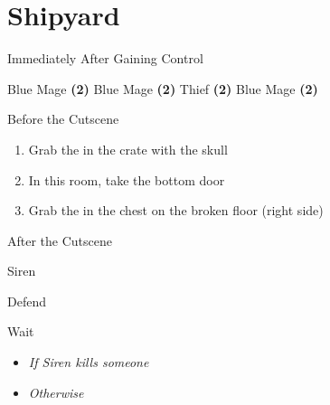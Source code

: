 \chapter{Shipyard}

\vspace{\baselineskip}

\begin{paracol}{2}

\begin{menu}{Immediately After Gaining Control}
	\varwb
    \begin{jobMenu}
        \lenna Blue Mage \textbf{(2\pointLeft)} \optimize
        \galuf Blue Mage \textbf{(2\pointLeft)} \equip{\broadsword}
        \faris Thief \textbf{(2\pointRight)}
        \bartz Blue Mage \textbf{(2\pointLeft)} \optimize
	\end{jobMenu}
    \varwe
\end{menu}

\switchcolumn
\begin{steproute}{Before the Cutscene}
\end{steproute}

\switchcolumn
\begin{enumerate}
    \item Grab the  in the crate with the skull
    \item In this room, take the bottom door
    \item Grab the  in the chest on the broken floor (right side)
\end{enumerate}

\switchcolumn
\begin{steproute}{After the Cutscene}
\end{steproute}

\switchcolumn
\begin{boss}{Siren}
    \varwb
    \begin{round}{1}
        \faris Defend
        \everyone \leftCommand{\blue} \then \goblinPunch
    \end{round}
    \begin{round}{2}
        \item {}
        \faris Wait
        \begin{itemize}
            \item \textit{If Siren kills someone} \then \battleGroup{\textbf{\phoenixDown}}
            \item \textit{Otherwise} \then {}
        \end{itemize}
        \everyone \leftCommand{\blue} \then \goblinPunch
    \end{round}
    \varwe
\end{boss}

\end{paracol}